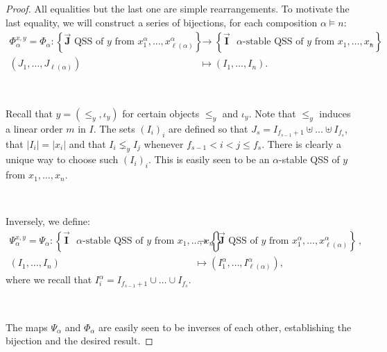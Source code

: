\documentclass[12pt, reqno]{amsart}
\theoremstyle{definition}
\newtheorem{smpl}[thm]{Example}
\newcommand{\III}{\vec{\mathbf{I}}}
\newcommand{\JJJ}{\vec{\mathbf{J}}}
\DeclareMathOperator{\pat}{\mathbf{pat}}
\begin{document}
\begin{proof}
All equalities but the last one are simple rearrangements.
To motivate the last equality, we will construct a series of bijections, for each composition $\alpha \models n$:
\begin{align*}
    \Phi_{\alpha}^{x, y} = \Phi_{\alpha} : \left\{ \JJJ \text{ QSS of $y$ from $x^{\alpha}_1, \dots, x^{\alpha}_{\ell(\alpha)}$}\right\} &\to \left\{ \III \text{ $\alpha$-stable QSS of $y$ from $x_1, \dots, x_n$}\right\}\, , \\
    (J_1, \dots, J_{\ell(\alpha)} ) &\mapsto (I_1, \dots , I_n).
\end{align*}

\

Recall that $y = (\leq_y, \iota_y)$ for certain objects $\leq_y$ and $\iota_y$.
Note that $\leq_y$ induces a linear order $m$ in $I$.
The sets $(I_i)_i$ are defined so that $J_s = I_{f_{s-1}+1} \uplus \dots \uplus I_{f_s}$, that $|I_i | = |x_i|$ and that $I_i \lneq_y I_j $ whenever $f_{s-1} < i < j \leq f_{s}$.
There is clearly a unique way to choose such $(I_i)_i$.
This is easily seen to be an $\alpha$-stable QSS of $y$ from $x_1, \dots, x_n$.

\

Inversely, we define:
\begin{align*}
    \Psi_{\alpha}^{x, y} = \Psi_{\alpha}  : \left\{ \III \text{ $\alpha$-stable QSS of $y$ from $x_1, \dots, x_n$}\right\} &\to \left\{ \JJJ \text{ QSS of $y$ from $x^{\alpha}_1, \dots, x^{\alpha}_{\ell(\alpha)}$}\right\} \, , \\
    (I_1, \dots , I_n) &\mapsto (I_1^{\alpha}, \dots, I^{\alpha}_{\ell(\alpha)} ),
\end{align*}
where we recall that $I^{\alpha}_i = I_{f_{s-1}+1} \cup \dots  \cup I_{f_s}$.

\

The maps $\Psi_{\alpha}$ and $\Phi_{\alpha}$ are easily seen to be inverses of each other, establishing the bijection and the desired result.
\end{proof}

\

%
\end{document}
